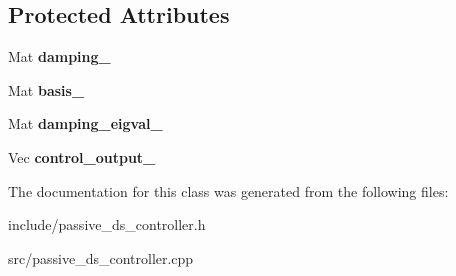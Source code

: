 \subsection*{Protected Attributes}
\begin{DoxyCompactItemize}
\item 
\hypertarget{classDSController_aad5c60f1f2bb0778ac3a801e730e1722}{Mat {\bfseries damping\+\_\+}}\label{classDSController_aad5c60f1f2bb0778ac3a801e730e1722}

\item 
\hypertarget{classDSController_a6f862346b14a9341c5702f5d63f08d93}{Mat {\bfseries basis\+\_\+}}\label{classDSController_a6f862346b14a9341c5702f5d63f08d93}

\item 
\hypertarget{classDSController_aad418cf55e7f8f6f65b475bbd56550b6}{Mat {\bfseries damping\+\_\+eigval\+\_\+}}\label{classDSController_aad418cf55e7f8f6f65b475bbd56550b6}

\item 
\hypertarget{classDSController_a04a9628bdf15d1891bf883b1c1e456b5}{Vec {\bfseries control\+\_\+output\+\_\+}}\label{classDSController_a04a9628bdf15d1891bf883b1c1e456b5}

\end{DoxyCompactItemize}


The documentation for this class was generated from the following files\+:\begin{DoxyCompactItemize}
\item 
include/passive\+\_\+ds\+\_\+controller.\+h\item 
src/passive\+\_\+ds\+\_\+controller.\+cpp\end{DoxyCompactItemize}
